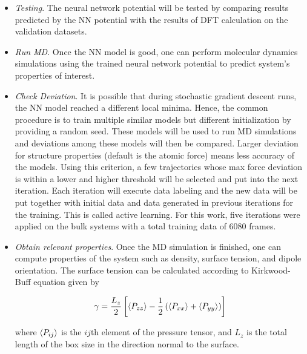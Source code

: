 \begin{itemize}
    \item \emph{Testing}. The neural network potential will be tested by
          comparing results predicted by the NN potential with	  the results
          of DFT
          calculation on the validation datasets.

    \item \emph{Run MD}. Once the NN model is good, one can perform molecular
          dynamics simulations using the trained neural   network potential to
          predict
          system's properties of interest.

    \item \emph{Check Deviation}. It is possible that during stochastic
          gradient descent runs, the NN model reached a different local minima.
          Hence,
          the common procedure is to train multiple similar models but
          different
          initialization by providing a  random seed. These models will be used
          to run MD simulations and deviations among these models will then be
          compared. Larger deviation for structure properties (default is the
          atomic
          force) means less accuracy of the models. Using this criterion, a few
          trajectories whose max force deviation is within a lower and higher
          threshold
          will be selected and put into the next iteration. Each iteration will
          execute data labeling  and  the new data will be put together with
          initial data
          and data generated in previous iterations for the training. This is
          called active learning. For this work, five iterations were applied
          on
          the bulk
          systems with a total training data of 6080 frames.

    \item \emph{Obtain relevant properties}. Once the MD
          simulation is
          finished, one can compute properties of the system such as density,
          surface
          tension, and dipole orientation.	    The surface tension can be
          calculated according to Kirkwood-Buff
          equation
          \cite{kirkwood1949} given by

          \begin{equation}
              \gamma = \frac{L_z}{2} \left[ \expval{P_{zz}} -\frac{1}{2} \left(
                  \expval{P_{xx}} + \expval{P_{yy}} \right) \right]
              \label{eq:surf_tens}
          \end{equation}

          where $\expval{P_{ij}}$ is the $ij$th element of the pressure tensor,
          and $L_z$ is the total length of the box size in the direction normal
          to the
          surface.

\end{itemize}
